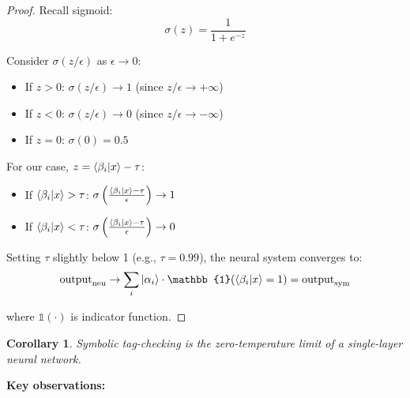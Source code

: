 \documentclass[11pt,a4paper]{article}
\newtheorem{corollary}[theorem]{Corollary}
\theoremstyle{definition}
\begin{document}
\begin{proof}
Recall sigmoid:
\begin{equation}
\sigma(z) = \frac{1}{1 + e^{-z}}
\end{equation}

Consider $\sigma(z/\epsilon)$ as $\epsilon \to 0$:
\begin{itemize}
\item If $z > 0$: $\sigma(z/\epsilon) \to 1$ (since $z/\epsilon \to +\infty$)
\item If $z < 0$: $\sigma(z/\epsilon) \to 0$ (since $z/\epsilon \to -\infty$)
\item If $z = 0$: $\sigma(0) = 0.5$
\end{itemize}

For our case, $z = \braket{\beta_i|x} - \tau$:
\begin{itemize}
\item If $\braket{\beta_i|x} > \tau$: $\sigma\left(\frac{\braket{\beta_i|x} - \tau}{\epsilon}\right) \to 1$
\item If $\braket{\beta_i|x} < \tau$: $\sigma\left(\frac{\braket{\beta_i|x} - \tau}{\epsilon}\right) \to 0$
\end{itemize}

Setting $\tau$ slightly below 1 (e.g., $\tau = 0.99$), the neural system converges to:
\begin{equation}
\text{output}_{\text{neu}} \to \sum_i \ket{\alpha_i} \cdot \mathbb{1}(\braket{\beta_i|x} = 1) = \text{output}_{\text{sym}}
\end{equation}

where $\mathbb{1}(\cdot)$ is indicator function.
\end{proof}

\begin{corollary}
Symbolic tag-checking is the zero-temperature limit of a single-layer neural network.
\end{corollary}

\textbf{Key observations:}
\end{document}
